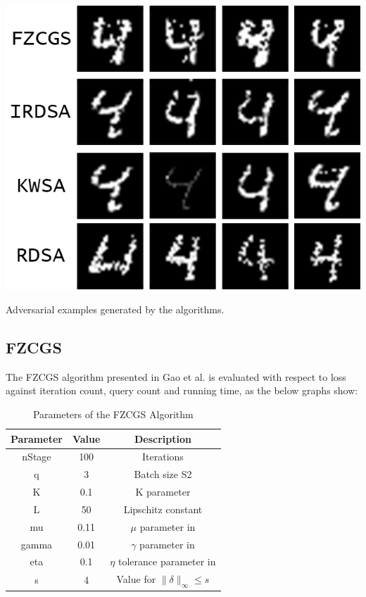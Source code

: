 \documentclass[10pt,twocolumn,letterpaper]{article}
\begin{document}
\begin{center}
   \includegraphics*[scale=1]{img/mnist_comparison.png}
\end{center}

\begin{center}
   \small{Adversarial examples generated by the algorithms.}
\end{center}

\subsection{FZCGS}

The FZCGS algorithm presented in Gao et al.\cite{Gao} is evaluated with respect to 
loss against iteration count, query count and running time, as the below graphs show:

\begin{table}[h]
   \centering
   \begin{tabular}{ccc}
       \hline
       \textbf{Parameter} & \textbf{Value} & \textbf{Description} \\
       \hline
       nStage & 100 & Iterations\\
       \hline
       q & 3 & Batch size S2\\
       \hline
       K & 0.1 & K parameter\\
       \hline
       L & 50 & Lipschitz constant \\
       \hline
       mu & 0.11 & $\mu$ parameter in \cite{Gao}\\
       \hline
       gamma & 0.01 & $\gamma$ parameter in \cite{Gao}\\
       \hline
       eta & 0.1 & $\eta$ tolerance parameter in \cite{Gao}\\
       \hline
       s & 4 & Value for $\|\delta\|_{\infty} \leq s$\\
       \hline
   \end{tabular}\\
   \
   \caption{Parameters of the FZCGS Algorithm} 
   \label{tab:fzcgs_params}
\end{table}
\end{document}
